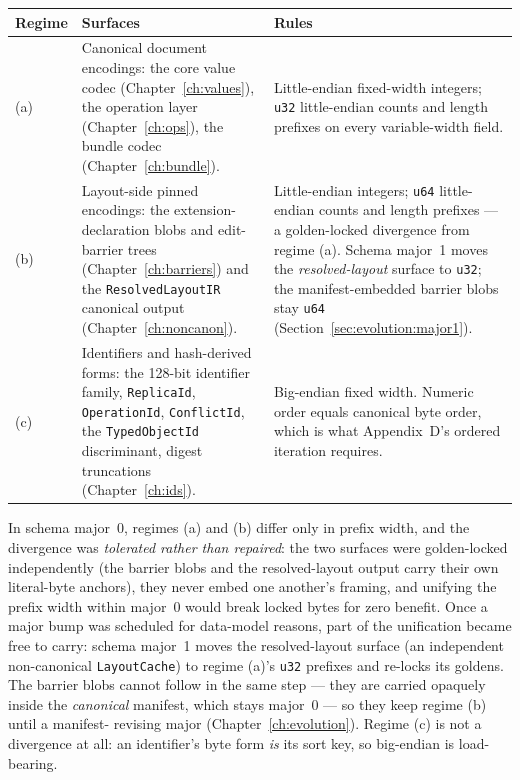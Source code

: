 \documentclass[11pt,letterpaper]{report}
\begin{document}
\begin{longtable}{p{0.55in} p{2.25in} p{2.85in}}
  \toprule
  \textbf{Regime} & \textbf{Surfaces} & \textbf{Rules} \\
  \midrule
  \endhead
  (a) & Canonical document encodings: the core value codec
        (Chapter~\ref{ch:values}), the operation layer
        (Chapter~\ref{ch:ops}), the bundle codec
        (Chapter~\ref{ch:bundle}). &
        Little-endian fixed-width integers; \texttt{u32} little-endian counts
        and length prefixes on every variable-width field. \\
  (b) & Layout-side pinned encodings: the extension-declaration blobs and
        edit-barrier trees (Chapter~\ref{ch:barriers}) and the
        \texttt{ResolvedLayoutIR} canonical output
        (Chapter~\ref{ch:noncanon}). &
        Little-endian integers; \texttt{u64} little-endian counts and length
        prefixes --- a golden-locked divergence from regime (a). Schema major~1
        moves the \emph{resolved-layout} surface to \texttt{u32}; the
        manifest-embedded barrier blobs stay \texttt{u64}
        (Section~\ref{sec:evolution:major1}). \\
  (c) & Identifiers and hash-derived forms: the 128-bit identifier family,
        \texttt{ReplicaId}, \texttt{OperationId}, \texttt{ConflictId}, the
        \texttt{TypedObjectId} discriminant, digest truncations
        (Chapter~\ref{ch:ids}). &
        Big-endian fixed width. Numeric order equals canonical byte order,
        which is what Appendix~D's ordered iteration requires. \\
  \bottomrule
\end{longtable}

\begin{rationale}
In schema major~0, regimes (a) and (b) differ only in prefix width, and the
divergence was \emph{tolerated rather than repaired}: the two surfaces were
golden-locked independently (the barrier blobs and the resolved-layout output
carry their own literal-byte anchors), they never embed one another's framing,
and unifying the prefix width within major~0 would break locked bytes for zero
benefit. Once a major bump was scheduled for data-model reasons, part of the
unification became free to carry: schema major~1 moves the resolved-layout
surface (an independent non-canonical \texttt{LayoutCache}) to regime (a)'s
\texttt{u32} prefixes and re-locks its goldens. The barrier blobs cannot follow
in the same step --- they are carried opaquely inside the \emph{canonical}
manifest, which stays major~0 --- so they keep regime (b) until a manifest-
revising major (Chapter~\ref{ch:evolution}). Regime (c) is not a divergence at
all: an identifier's byte form \emph{is} its sort key, so big-endian is
load-bearing.
\end{rationale}
\end{document}
